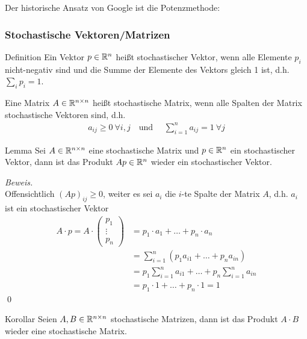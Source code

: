 Der historische Ansatz von Google ist die Potenzmethode:

\subsubsection{Stochastische Vektoren/Matrizen}
\begin{colbox}{Definition}
  Ein Vektor $p\in\mathbb R^n$ heißt stochastischer Vektor, wenn alle Elemente $p_i$ nicht-negativ sind und die 
  Summe der Elemente des Vektors gleich 1 ist, d.h. $\sum_{i} p_i = 1$. 

  Eine Matrix $A\in\mathbb R^{n\times n}$ heißt stochastische Matrix, wenn alle Spalten der Matrix stochastische 
  Vektoren sind, d.h.
  \begin{align*}
    a_{ij}\geq 0\ \forall i,j \quad \text{und } \quad \sum_{i=1}^n a_{ij}=1\ \forall j
  \end{align*}

\end{colbox}

\begin{colbox}{Lemma}
  Sei $A\in\mathbb R^{n\times n}$ eine stochastische Matrix und $p\in\mathbb R^{n}$ ein stochastischer Vektor, dann ist 
  das Produkt $Ap\in\mathbb R^{n}$ wieder ein stochastischer Vektor.
\end{colbox}

\textit{Beweis.} \\
Offensichtlich $(Ap)_{ij}\geq 0$, weiter es sei $a_i$ die $i$-te Spalte der Matrix $A$, d.h. $a_i$ ist ein stochastischer Vektor
\begin{align*}
  A\cdot p = A\cdot \begin{pmatrix}
  p_1 \\ \vdots \\ p_n
\end{pmatrix} &= p_1\cdot a_1 + \dots + p_n\cdot a_n \\
&= \sum_{i=1}^n (p_1a_{i1} + \dots + p_na_{in}) \\
&= p_1\sum_{i=1}^n a_{i1} + \dots +  p_n\sum_{i=1}^na_{in} \\
&= p_1\cdot 1 + \dots + p_n\cdot 1 = 1
\end{align*}
\qed

\begin{colbox}{Korollar}\label{cor:stochMatProd}
  Seien $A,B\in\mathbb R^{n\times n}$ stochastische Matrizen, dann ist das Produkt $A\cdot B$ wieder eine stochastische Matrix.
\end{colbox}

